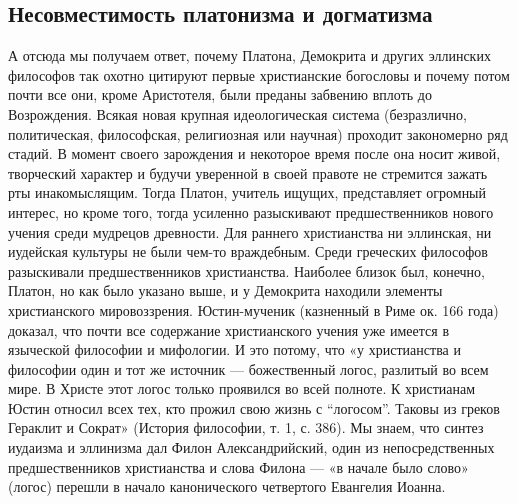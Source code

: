 \subsection{Несовместимость платонизма и догматизма}

А отсюда мы получаем ответ, почему Платона, Демокрита и других
эллинских философов так охотно цитируют первые христианские богословы
и почему потом почти все они, кроме Аристотеля, были преданы забвению
вплоть до Возрождения. Всякая новая крупная идеологическая система
(безразлично, политическая, философская, религиозная или научная)
проходит закономерно ряд стадий. В момент своего зарождения и
некоторое время после она носит живой, творческий характер и будучи
уверенной в своей правоте не стремится зажать рты инакомыслящим. Тогда
Платон, учитель ищущих, представляет огромный интерес, но кроме того,
тогда усиленно разыскивают предшественников нового учения среди
мудрецов древности. Для раннего христианства ни эллинская, ни
иудейская культуры не были чем-то враждебным. Среди греческих
философов разыскивали предшественников христианства. Наиболее близок
был, конечно, Платон, но как было указано выше, и у Демокрита находили
элементы христианского мировоззрения. Юстин-мученик (казненный в Риме
ок. 166 года) доказал, что почти все содержание христианского учения
уже имеется в языческой философии и мифологии. И это потому, что «у
христианства и философии один и тот же источник --- божественный
логос, разлитый во всем мире. В Христе этот логос только проявился во
всей полноте. К христианам Юстин относил всех тех, кто прожил свою
жизнь с ``логосом''. Таковы из греков Гераклит и Сократ» (История
философии, т. 1, с. 386). Мы знаем, что синтез иудаизма и эллинизма
дал Филон Александрийский, один из непосредственных предшественников
христианства и слова Филона --- «в начале было слово» (логос) перешли
в начало канонического четвертого Евангелия Иоанна.

